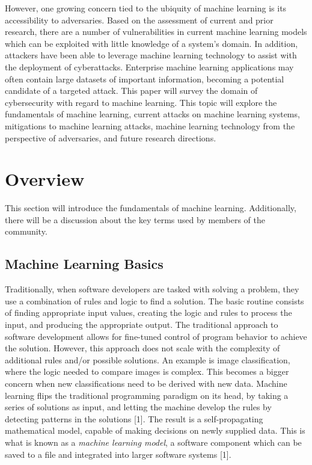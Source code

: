 \documentclass[11pt,conference]{IEEEtran}
\begin{document}
However, one growing concern tied to the ubiquity of machine learning is its 
accessibility to adversaries. Based on the assessment of current and prior
research, there are a number of vulnerabilities in current machine learning
models which can be exploited with little knowledge of a system's domain. In
addition, attackers have been able to leverage machine learning technology to
assist with the deployment of cyberattacks. Enterprise machine learning applications
may often contain large datasets of important information, becoming a potential 
candidate of a targeted attack. This paper will survey the domain of
cybersecurity with regard to machine learning. This topic will explore the
fundamentals of machine learning, current attacks on machine learning
systems, mitigations to machine learning attacks, machine learning technology from the perspective of adversaries, and
future research directions.

\section{Overview}
This section will introduce the fundamentals of machine learning. Additionally,
there will be a discussion about the key terms used by members of the community.

\subsection{Machine Learning Basics}
Traditionally, when software developers are tasked with solving a problem, they
use a combination of rules and logic to find a solution. The basic
routine consists of finding appropriate input values,
creating the logic and rules to process the input, and producing the appropriate output.
The traditional approach to software development allows for fine-tuned control
of program behavior to achieve the solution. However, this approach does not scale
with the complexity of additional rules and/or possible solutions. An
example is image classification, where the logic needed to compare images
is complex. This becomes a bigger concern when new classifications need to be
derived with new data. Machine learning flips the traditional programming
paradigm on its head, by taking a series of solutions as input, and
letting the machine develop the rules by detecting patterns in the solutions
[1].
The result is a self-propagating mathematical model, capable of making
decisions on newly supplied data. This is what is known as a \emph{machine
learning model}, a software component which can be saved to a file and
integrated into larger software systems [1].
\end{document}
